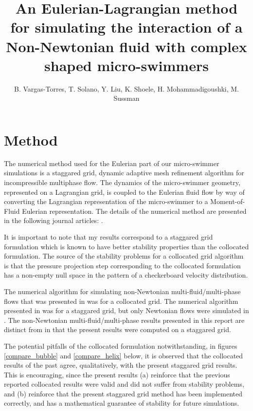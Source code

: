 \documentclass[]{article}
\title{An Eulerian-Lagrangian method for simulating the interaction of a 
 Non-Newtonian fluid with complex shaped micro-swimmers}
\author{B. Vargas-Torres,
   T. Solano, Y. Liu, K. Shoele, H. Mohammadigoushki, M. Sussman}
\begin{document}
\maketitle
\vspace*{-10mm}
\section{Method} 
The numerical method used for the Eulerian part of
our micro-swimmer simulations is a staggared
grid, dynamic adaptive mesh refinement algorithm for 
incompressible multiphase flow.  
The dynamics of the micro-swimmer geometry, represented on a 
Lagrangian grid, is coupled to the Eulerian fluid flow by way of converting
the Lagrangian representation of the micro-swimmer to a
Moment-of-Fluid Eulerian representation.  The details of the numerical method
are presented in the following journal articles: 
\cite{dyadechko2005moment,ArientiSussman2014,peihierarchical,OHTA201966}.

It is important to note that my results correspond to a staggared grid 
formulation which is known to have better stability properties than the
collocated formulation\cite{rhie1983numerical}.  
The source of the stability problems for a collocated grid algorithm
is that the pressure projection step corresponding
to the collocated formulation has a non-empty null space in the pattern of
a checkerboard velocity distribution.

The numerical algorithm
for simulating non-Newtonian multi-fluid/multi-phase flows that was
presented in \cite{OHTA201966} was for a collocated grid.  The numerical
algorithm presented in \cite{peihierarchical} was for a staggared grid,
but only Newtonian flows were simulated in \cite{peihierarchical}.
The non-Newtonian multi-fluid/multi-phase results presented in 
this report are distinct from \cite{OHTA201966}
in that the present results were computed on a staggared grid.

The potential pitfalls of the collocated formulation notwithstanding,
in figures \ref{compare_bubble} and
\ref{compare_helix} below, it is observed that the collocated results of the
past agree, qualitatively, with the present staggared grid results.  This
is encouraging, since the present results (a) reinforce that the previous 
reported collocated results were valid and did not suffer from stability 
problems, and (b) reinforce that the present staggared grid method has 
been implemented correctly, and has a mathematical guarantee of 
stability\cite{GUITTET2015215} for future simulations.
\end{document}
